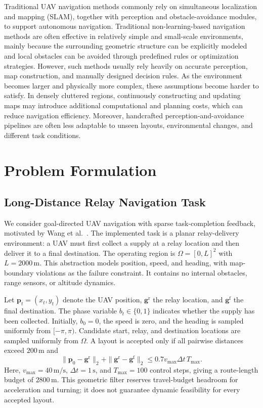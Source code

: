 \documentclass{article}
\begin{document}
Traditional UAV navigation methods commonly rely on simultaneous localization and mapping (SLAM), together with perception and obstacle-avoidance modules, to support autonomous navigation. Traditional non-learning-based navigation methods are often effective in relatively simple and small-scale environments, mainly because the surrounding geometric structure can be explicitly modeled and local obstacles can be avoided through predefined rules or optimization strategies. However, such methods usually rely heavily on accurate perception, map construction, and manually designed decision rules. As the environment becomes larger and physically more complex, these assumptions become harder to satisfy. In densely cluttered regions, continuously constructing and updating maps may introduce additional computational and planning costs, which can reduce navigation efficiency. Moreover, handcrafted perception-and-avoidance pipelines are often less adaptable to unseen layouts, environmental changes, and different task conditions.

\section{Problem Formulation}

\subsection{Long-Distance Relay Navigation Task}

We consider goal-directed UAV navigation with sparse task-completion feedback, motivated by Wang et al.~\cite{wang2020deep}. The implemented task is a planar relay-delivery environment: a UAV must first collect a supply at a relay location and then deliver it to a final destination. The operating region is $\Omega=[0,L]^2$ with $L=2000\,\mathrm{m}$. This abstraction models position, speed, and heading, with map-boundary violations as the failure constraint. It contains no internal obstacles, range sensors, or altitude dynamics.

Let $\mathbf p_t=(x_t,y_t)$ denote the UAV position, $\mathbf g^{\mathrm r}$ the relay location, and $\mathbf g^{\mathrm f}$ the final destination. The phase variable $b_t\in\{0,1\}$ indicates whether the supply has been collected. Initially, $b_0=0$, the speed is zero, and the heading is sampled uniformly from $[-\pi,\pi)$. Candidate start, relay, and destination locations are sampled uniformly from $\Omega$. A layout is accepted only if all pairwise distances exceed $200\,\mathrm{m}$ and
\begin{equation}
\|\mathbf p_0-\mathbf g^{\mathrm r}\|_2
+\|\mathbf g^{\mathrm r}-\mathbf g^{\mathrm f}\|_2
\le 0.7v_{\max}\Delta t\,T_{\max}.
\label{eq:uav_layout_budget}
\end{equation}
Here, $v_{\max}=40\,\mathrm{m/s}$, $\Delta t=1\,\mathrm{s}$, and $T_{\max}=100$ control steps, giving a route-length budget of $2800\,\mathrm{m}$. This geometric filter reserves travel-budget headroom for acceleration and turning; it does not guarantee dynamic feasibility for every accepted layout.
\end{document}
